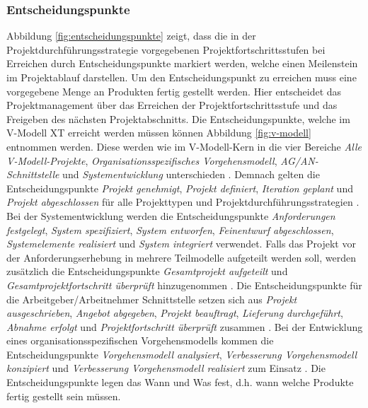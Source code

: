  \subsubsection{Entscheidungspunkte}
Abbildung \ref{fig:entscheidungspunkte} zeigt, dass die in der Projektdurchführungsstrategie vorgegebenen Projektfortschrittsstufen bei Erreichen durch Entscheidungspunkte markiert werden, welche einen Meilenstein im Projektablauf darstellen. Um den Entscheidungspunkt zu erreichen muss eine vorgegebene Menge an Produkten fertig gestellt werden. Hier entscheidet das Projektmanagement über das Erreichen der Projektfortschrittsstufe und das Freigeben des nächsten Projektabschnitts. Die Entscheidungspunkte, welche im V-Modell XT erreicht werden müssen können Abbildung \ref{fig:v-modell} entnommen werden. Diese werden wie im V-Modell-Kern in die vier Bereiche \textit{Alle V-Modell-Projekte}, \textit{Organisationsspezifisches Vorgehensmodell}, \textit{AG/AN-Schnittstelle} und \textit{Systementwicklung} unterschieden \cite{2004vmodell}. \newline
Demnach gelten die Entscheidungspunkte \textit{Projekt genehmigt}, \textit{Projekt definiert}, \textit{Iteration geplant} und \textit{Projekt abgeschlossen} für alle Projekttypen und Projektdurchführungsstrategien \cite{2004vmodell}. \newline
Bei der Systementwicklung werden die Entscheidungspunkte \textit{Anforderungen festgelegt}, \textit{System spezifiziert}, \textit{System entworfen}, \textit{Feinentwurf abgeschlossen}, \textit{Systemelemente realisiert} und \textit{System integriert} verwendet. Falls das Projekt vor der Anforderungserhebung in mehrere Teilmodelle aufgeteilt werden soll, werden zusätzlich die Entscheidungspunkte \textit{Gesamtprojekt aufgeteilt} und \textit{Gesamtprojektfortschritt überprüft} hinzugenommen \cite{2004vmodell}. \newline
Die Entscheidungspunkte für die Arbeitgeber/Arbeitnehmer Schnittstelle setzen sich aus \textit{Projekt ausgeschrieben}, \textit{Angebot abgegeben}, \textit{Projekt beauftragt}, \textit{Lieferung durchgeführt}, \textit{Abnahme erfolgt} und \textit{Projektfortschritt überprüft} zusammen \cite{2004vmodell}. \newline
 Bei der Entwicklung eines organisationsspezifischen Vorgehensmodells kommen die Entscheidungspunkte \textit{Vorgehensmodell analysiert}, \textit{Verbesserung Vorgehensmodell konzipiert} und \textit{Verbesserung Vorgehensmodell realisiert} zum Einsatz \cite{2004vmodell}. \newline
 Die Entscheidungspunkte legen das \grqq Wann\grqq {} und \grqq Was\grqq {} fest, d.h. wann welche Produkte fertig gestellt sein müssen.

